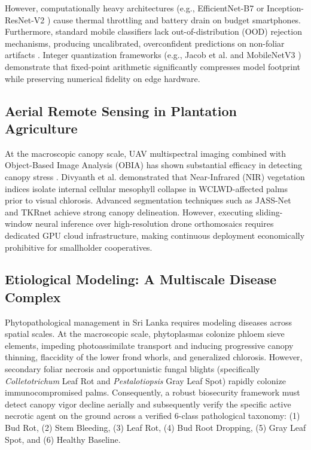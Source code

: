 \documentclass[conference,a4paper]{IEEEtran}
\begin{document}
However, computationally heavy architectures (e.g., EfficientNet-B7 or Inception-ResNet-V2 \cite{b12}) cause thermal throttling and battery drain on budget smartphones. Furthermore, standard mobile classifiers lack out-of-distribution (OOD) rejection mechanisms, producing uncalibrated, overconfident predictions on non-foliar artifacts \cite{b19,b20}. Integer quantization frameworks (e.g., Jacob et al. \cite{b22} and MobileNetV3 \cite{b23}) demonstrate that fixed-point arithmetic significantly compresses model footprint while preserving numerical fidelity on edge hardware.

\subsection{Aerial Remote Sensing in Plantation Agriculture}
At the macroscopic canopy scale, UAV multispectral imaging combined with Object-Based Image Analysis (OBIA) has shown substantial efficacy in detecting canopy stress \cite{b13}. Divyanth et al. \cite{b13} demonstrated that Near-Infrared (NIR) vegetation indices isolate internal cellular mesophyll collapse in WCLWD-affected palms prior to visual chlorosis. Advanced segmentation techniques such as JASS-Net \cite{b14} and TKRnet \cite{b15} achieve strong canopy delineation. However, executing sliding-window neural inference over high-resolution drone orthomosaics requires dedicated GPU cloud infrastructure, making continuous deployment economically prohibitive for smallholder cooperatives.

\subsection{Etiological Modeling: A Multiscale Disease Complex}
Phytopathological management in Sri Lanka requires modeling diseases across spatial scales. At the macroscopic scale, phytoplasmas colonize phloem sieve elements, impeding photoassimilate transport and inducing progressive canopy thinning, flaccidity of the lower frond whorls, and generalized chlorosis. However, secondary foliar necrosis and opportunistic fungal blights (specifically \textit{Colletotrichum} Leaf Rot and \textit{Pestalotiopsis} Gray Leaf Spot) rapidly colonize immunocompromised palms. Consequently, a robust biosecurity framework must detect canopy vigor decline aerially and subsequently verify the specific active necrotic agent on the ground across a verified 6-class pathological taxonomy: (1) Bud Rot, (2) Stem Bleeding, (3) Leaf Rot, (4) Bud Root Dropping, (5) Gray Leaf Spot, and (6) Healthy Baseline.
\end{document}
